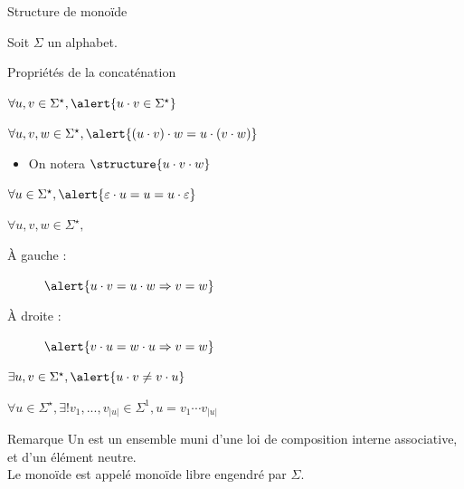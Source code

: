
\begingroup

\begin{frame}{Structure de monoïde}

  Soit $\Sigma$ un alphabet. 
  
  \begin{block}{Propriétés de la concaténation}
    \begin{description}
    \item[Fermeture :] $\forall u, v \in \Sigma^\star, \alert{u\cdot v \in \Sigma^\star}$
    \item[Associativité :] $\forall u, v, w \in \Sigma^\star, \alert{(u\cdot v)\cdot w = u\cdot (v\cdot w)}$
      \begin{itemize}
      \item On notera $\structure{u\cdot v\cdot w}$
      \end{itemize}
    \item[Neutralité d'$\varepsilon$ :] $\forall u \in \Sigma^\star, \alert{\varepsilon \cdot u = u = u \cdot \varepsilon}$
    \item[Simplifiabilité :] $\forall u, v, w \in \Sigma^\star,$
      \begin{description}
      \item[À gauche :] $\alert{u \cdot v = u \cdot w \Rightarrow v=w}$
      \item[À droite :] $\alert{v \cdot u = w \cdot u \Rightarrow v=w}$
      \end{description}
    \item[Non-commutativité :] $\exists u,v \in \Sigma^\star, \alert{u\cdot v \neq v\cdot u}$
    \item[Décomposabilité :] $\forall u\in \Sigma^\star, \exists! v_1,..., v_{|u|} \in \Sigma^1, u = v_1 \cdots v_{|u|}$ 
    \end{description}
  \end{block}

  \begin{block}{Remarque}
    Un  est un ensemble muni d'une loi de composition interne associative, et d'un élément neutre. \\
    Le monoïde \structure{$\langle \Sigma^\star, \cdot , \varepsilon \rangle$} est appelé \alert{monoïde libre engendré par $\Sigma$}.
  \end{block}

\end{frame}

\endgroup
\endinput
